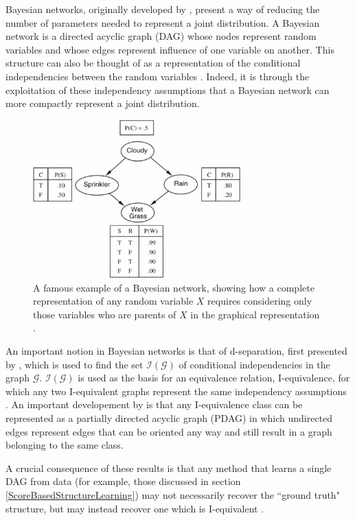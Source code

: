 \documentclass [11pt]{article}
\begin{document}
Bayesian networks, originally developed by \citet{pearl88}, present a way of reducing the number of parameters needed to represent a joint distribution. A Bayesian network is a directed acyclic graph (DAG) whose nodes represent random variables and whose edges represent influence of one variable on another. This structure can also be thought of as a representation of the conditional independencies between the random variables \citep{koller09}. Indeed, it is through the exploitation of these independency assumptions that a Bayesian network can more compactly represent a joint distribution.
\begin{figure}[H]\label{fig:sprinkler}
\centering
\caption{A famous example of a Bayesian network, showing how a complete representation of any random variable $X$ requires considering only those variables who are parents of $X$ in the graphical representation \citep{norvig94}.}
\includegraphics[width=8cm]{sprinkler.jpg}
\end{figure}
An important notion in Bayesian networks is that of d-separation, first presented by \citet{pearl86}, which is used to find the set $\mathcal{I}(\mathcal{G})$ of conditional independencies in the graph $\mathcal{G}$. $\mathcal{I}(\mathcal{G})$ is used as the basis for an equivalence relation, I-equivalence, for which any two I-equivalent graphs represent the same independency assumptions \citep{verma91}. An important developement by \citet{pearl86} is that any I-equivalence class can be represented as a partially directed acyclic graph (PDAG) in which undirected edges represent edges that can be oriented any way and still result in a graph belonging to the same class.

A crucial consequence of these results is that any method that learns a single DAG from data (for example, those discussed in section \ref{ScoreBasedStructureLearning}) may not necessarily recover the ``ground truth" structure, but may instead recover one which is I-equivalent \citep{verma91}.
\end{document}
